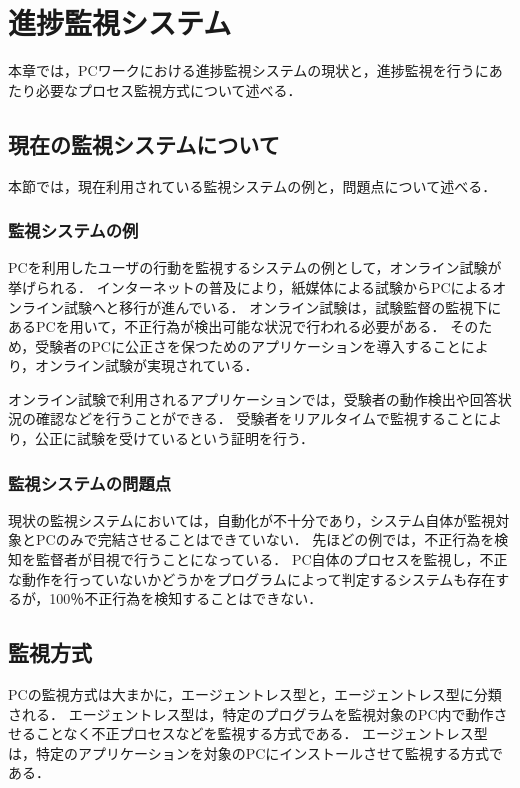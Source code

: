 \chapter{進捗監視システム}

本章では，PCワークにおける進捗監視システムの現状と，進捗監視を行うにあたり必要なプロセス監視方式について述べる．

\section{現在の監視システムについて}

本節では，現在利用されている監視システムの例と，問題点について述べる．

\subsection{監視システムの例}
PCを利用したユーザの行動を監視するシステムの例として，オンライン試験が挙げられる．
インターネットの普及により，紙媒体による試験からPCによるオンライン試験へと移行が進んでいる．
オンライン試験は，試験監督の監視下にあるPCを用いて，不正行為が検出可能な状況で行われる必要がある．
そのため，受験者のPCに公正さを保つためのアプリケーションを導入することにより，オンライン試験が実現されている．

オンライン試験で利用されるアプリケーションでは，受験者の動作検出や回答状況の確認などを行うことができる．
受験者をリアルタイムで監視することにより，公正に試験を受けているという証明を行う．

\subsection{監視システムの問題点}
現状の監視システムにおいては，自動化が不十分であり，システム自体が監視対象とPCのみで完結させることはできていない．
先ほどの例では，不正行為を検知を監督者が目視で行うことになっている．
PC自体のプロセスを監視し，不正な動作を行っていないかどうかをプログラムによって判定するシステムも存在するが，100％不正行為を検知することはできない．

\section{監視方式}
PCの監視方式は大まかに，エージェントレス型と，エージェントレス型に分類される．
エージェントレス型は，特定のプログラムを監視対象のPC内で動作させることなく不正プロセスなどを監視する方式である．
エージェントレス型は，特定のアプリケーションを対象のPCにインストールさせて監視する方式である．

